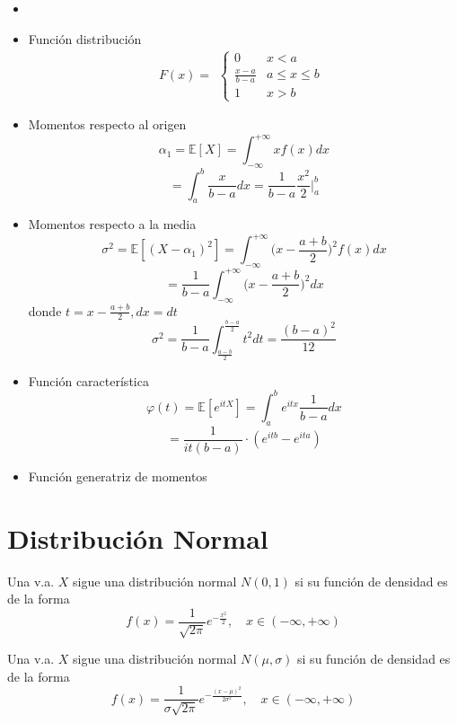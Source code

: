 \begin{prop}
  \begin{itemize}
    \item []
    \item Función distribución
      \[ 
        F(x) =
        \begin{aligned}
          \begin{cases}
            0 & x < a \\
            \frac{x-a}{b-a} & a \leq x \leq b \\
            1 & x > b
          \end{cases}
        \end{aligned} 
      \] 
    \item Momentos respecto al origen
      \[ 
        \alpha_{1} = \mathbb{E} [ X ] = \int_{- \infty}^{+ \infty} x f(x) dx 
      \] 
      \[ 
        = \int_{a}^{b} \frac{x}{b - a} dx = \frac{1}{b - a} \frac{x^{2}}{2} \Bigg |_{a}^{b} 
      \] 
    \item Momentos respecto a la media
      \[ 
        \sigma^{2} = \mathbb{E} [ (X -\alpha_{1})^{2} ] = \int_{- \infty}^{+ \infty} \Big ( x - \frac{a + b}{2} \Big )^{2} f(x) dx
      \] 
      \[ 
        = \frac{1}{b - a} \int_{- \infty}^{+ \infty} \Big ( x - \frac{a + b}{2} \Big )^{2} dx
      \] 
      donde $ t = x -\frac{a + b}{2}, dx = dt$
      \[ 
        \sigma^{2} = \frac{1}{b - a} \int_{\frac{a -b}{2}}^{\frac{b-a}{2}} t^{2} dt = \frac{(b - a)^{2}}{12} 
      \] 
    \item Función característica
      \[ 
        \varphi(t) = \mathbb{E} [ e^{itX} ] = \int_{a}^{b} e^{itx} \frac{1}{b - a} dx
      \] 
      \[ 
        = \frac{1}{it(b -a)} \cdot (e^{itb} - e^{ita}) 
      \] 
    \item Función generatriz de momentos
  \end{itemize}
\end{prop}

\section{Distribución Normal}

\begin{defn}
  Una v.a. $X$ sigue una distribución normal $N(0,1)$ si su función de densidad es de la forma
  \[ 
    f(x) = \frac{1}{\sqrt{2 \pi}} e^{- \frac{x^{2}}{2}}, \quad x \in (-\infty, + \infty)
  \] 
\end{defn}

\begin{defn}
  Una v.a. $X$ sigue una distribución normal $N(\mu, \sigma)$ si su función de densidad es de la forma
  \[ 
    f(x) = \frac{1}{\sigma \sqrt{2 \pi}} e^{- \frac{(x -\mu)^{2}}{2 \sigma^{2}}}, \quad x \in (-\infty, + \infty)
  \] 
\end{defn}


